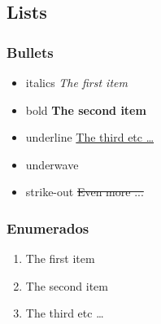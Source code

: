 \documentclass[12pt]{article}  %
\begin{document}
\subsection{Lists}

\subsubsection{Bullets}

\begin{itemize}
  \item italics \textit{The first item}
  \item bold \textbf{The second item}
  \item underline \uline{The third etc \ldots}
  \item underwave 
  \item strike-out \sout{Even more ...}
\end{itemize}

\subsubsection{Enumerados}

\begin{enumerate}
  \item The first item
  \item The second item
  \item The third etc \ldots
\end{enumerate}
\end{document}
